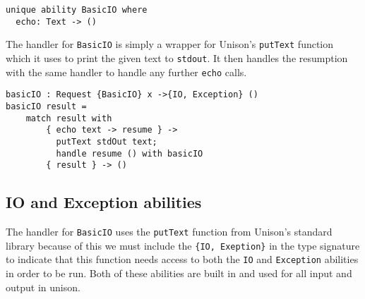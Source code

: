 \documentclass[logo,bsc,singlespacing,parskip]{infthesis}
\begin{document}
\begin{lstlisting}[language=unison]
unique ability BasicIO where
  echo: Text -> ()
\end{lstlisting}

The handler for \texttt{BasicIO} is simply a wrapper for Unison's
\texttt{putText} function which it uses to print the given text to
\texttt{stdout}. It then handles the resumption with the same handler to handle
any further \texttt{echo} calls.

\begin{lstlisting}[language=unison]
basicIO : Request {BasicIO} x ->{IO, Exception} ()
basicIO result =
    match result with
        { echo text -> resume } -> 
          putText stdOut text; 
          handle resume () with basicIO
        { result } -> ()
\end{lstlisting}

\subsection{IO and Exception abilities}

The handler for \texttt{BasicIO} uses the \texttt{putText} function from
Unison's standard library because of this we must include the \texttt{\{IO,
Exeption\}} in the type signature to indicate that this function needs access
to both the \texttt{IO} and \texttt{Exception} abilities in order to be run.
Both of these abilities are built in and used for all input and output in
unison.
\end{document}
